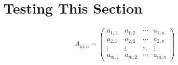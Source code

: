 \documentclass{article}
\begin{document}

\section{Testing This Section}

\begin{align}
A_{m,n} = 
 \begin{pmatrix}
  a_{1,1} & a_{1,2} & \cdots & a_{1,n} \\
  a_{2,1} & a_{2,2} & \cdots & a_{2,n} \\
  \vdots  & \vdots  & \ddots & \vdots  \\
  a_{m,1} & a_{m,2} & \cdots & a_{m,n} 
 \end{pmatrix}
\end{align}
\end{document}
